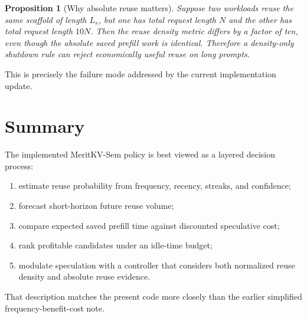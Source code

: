 \documentclass[11pt]{article}
\newtheorem{proposition}{Proposition}
\begin{document}
\begin{proposition}[Why absolute reuse matters]
Suppose two workloads reuse the same scaffold of length $L_s$, but one has total
request length $N$ and the other has total request length $10N$. Then the reuse
density metric differs by a factor of ten, even though the absolute saved prefill
work is identical. Therefore a density-only shutdown rule can reject economically
useful reuse on long prompts.
\end{proposition}

\noindent
This is precisely the failure mode addressed by the current implementation update.

\section{Summary}

The implemented MeritKV-Sem policy is best viewed as a layered decision process:
\begin{enumerate}
    \item estimate reuse probability from frequency, recency, streaks, and confidence;
    \item forecast short-horizon future reuse volume;
    \item compare expected saved prefill time against discounted speculative cost;
    \item rank profitable candidates under an idle-time budget;
    \item modulate speculation with a controller that considers both normalized reuse
    density and absolute reuse evidence.
\end{enumerate}

That description matches the present code more closely than the earlier simplified
frequency-benefit-cost note.
\end{document}
